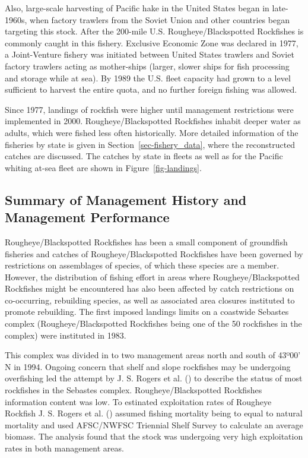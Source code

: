 \documentclass[
]{scrartcl}
\begin{document}
Also, large-scale harvesting of Pacific hake in the United States began
in late-1960s, when factory trawlers from the Soviet Union and other
countries began targeting this stock. After the 200-mile U.S.
Rougheye/Blackspotted Rockfishes is commonly caught in this fishery.
Exclusive Economic Zone was declared in 1977, a Joint-Venture fishery
was initiated between United States trawlers and Soviet factory trawlers
acting as mother-ships (larger, slower ships for fish processing and
storage while at sea). By 1989 the U.S. fleet capacity had grown to a
level sufficient to harvest the entire quota, and no further foreign
fishing was allowed.

Since 1977, landings of rockfish were higher until management
restrictions were implemented in 2000. Rougheye/Blackspotted Rockfishes
inhabit deeper water as adults, which were fished less often
historically. More detailed information of the fisheries by state is
given in Section~\ref{sec-fishery_data}, where the reconstructed catches
are discussed. The catches by state in fleets as well as for the Pacific
whiting at-sea fleet are shown in Figure~\ref{fig-landings}.

\subsection{Summary of Management History and Management
Performance}\label{summary-of-management-history-and-management-performance}

Rougheye/Blackspotted Rockfishes has been a small component of
groundfish fisheries and catches of Rougheye/Blackspotted Rockfishes
have been governed by restrictions on assemblages of species, of which
these species are a member. However, the distribution of fishing effort
in areas where Rougheye/Blackspotted Rockfishes might be encountered has
also been affected by catch restrictions on co-occurring, rebuilding
species, as well as associated area closures instituted to promote
rebuilding. The first imposed landings limits on a coastwide Sebastes
complex (Rougheye/Blackspotted Rockfishes being one of the 50 rockfishes
in the complex) were instituted in 1983.

This complex was divided in to two management areas north and south of
43º00' N in 1994. Ongoing concern that shelf and slope rockfishes may be
undergoing overfishing led the attempt by J. S. Rogers et al.
() to describe the status of most
rockfishes in the Sebastes complex. Rougheye/Blackspotted Rockfishes
information content was low. To estinated exploitation rates of Rougheye
Rockfish J. S. Rogers et al. ()
assumed fishing mortality being to equal to natural mortality and used
AFSC/NWFSC Triennial Shelf Survey to calculate an average biomass. The
analysis found that the stock was undergoing very high exploitation
rates in both management areas.
\end{document}
